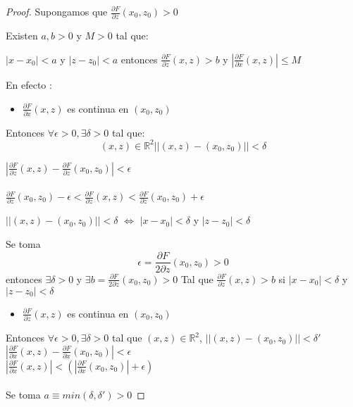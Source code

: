 \begin{proof}
Supongamos que $\frac{\partial F}{\partial z}(x_{0},z_{0})>0$\\
\begin{Afi}
Existen $a,b > 0$ y $M>0$ tal que:\
\begin{center}
$ |x-x_{0}|<a$ y $|z-z_{0}|<a $ entonces  $\frac{\partial F}{\partial z}(x,z)>b$ y $|\frac{\partial F}{\partial x}(x,z)|\leq M$
\end{center}
\end{Afi}
En efecto :\
\begin{itemize}
    \item $\frac{\partial F}{\partial x}(x,z)$ es continua en $(x_{0},z_{0})$
\end{itemize}
Entonces $\forall \epsilon >0, \exists \delta >0$ tal que:\
   $$(x,z)\in \mathbb{R}^2 ||(x,z)-(x_{0},z_{0})||< \delta$$
    
    $ |\frac{\partial F}{\partial z}(x,z)-\frac{\partial F}{\partial z}(x_{0},z_{0})|< \epsilon$\\\\
    $\frac{\partial F}{\partial z}(x_{0},z_{0})- \epsilon < \frac{\partial F}{\partial z}(x,z) < \frac{\partial F}{\partial z}(x_{0},z_{0}) + \epsilon$
\begin{Obs}
$||(x,z)-(x_{0},z_{0})||< \delta $ $\Longleftrightarrow$ $|x-x_{0}|<\delta$ y $|z-z_{0}|<\delta$
\end{Obs} 
Se toma $$\epsilon=\frac{\partial F}{2\partial z}(x_{0},z_{0})>0$$ entonces 
    $\exists \delta > 0$ y $\exists b=\frac{\partial F}{2\partial z}(x_{0},z_{0})>0$ 
Tal que
    $\frac{\partial F}{\partial z}(x,z) > b$ si $|x-x_{0}|< \delta $ y $|z-z_{0}|< \delta$
\begin{itemize}
    \item $\frac{\partial F}{\partial z}(x,z)$ es continua en $(x_{0},z_{0})$
\end{itemize}
Entonces $\forall \epsilon >0, \exists \delta >0$ tal que
    $(x,z)\in \mathbb{R}^2$, $||(x,z)-(x_{0},z_{0})||< \delta'$\\
    
    $ |\frac{\partial F}{\partial x}(x,z)-\frac{\partial F}{\partial x}(x_{0},z_{0})|< \epsilon$ \\
    
    $ |\frac{\partial F}{\partial x}(x,z)|< (|\frac{\partial F}{\partial x}(x_{0},z_{0})|+\epsilon)$\\\\
Se toma $a \equiv min ({\delta ,\delta'})> 0$


\end{proof}
